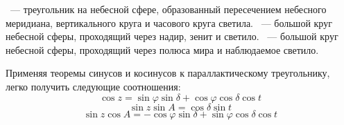 ~--- треугольник на небесной  сфере, образованный пересечением небесного меридиана, вертикального круга и часового круга светила. ~--- большой круг небесной сферы, проходящий через надир, зенит и светило. ~--- большой круг небесной сферы, проходящий через полюса мира и наблюдаемое светило.

Применяя теоремы синусов и косинусов к параллактическому треугольнику, легко получить следующие соотношения:
\begin{equation}
\cos z=\sin\varphi\sin\delta+\cos\varphi\cos\delta\cos t
\end{equation}
\begin{equation}
\sin z\sin A=\cos\delta\sin t
\end{equation}
\begin{equation}
\sin z\cos A=-\cos\varphi\sin\delta+\sin\varphi\cos\delta\cos t
\end{equation}





